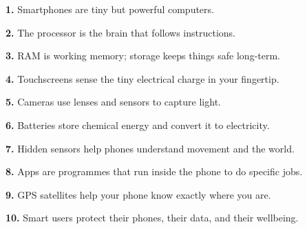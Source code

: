 \documentclass[11pt,openany]{book}
\begin{document}
\begin{tcolorbox}[enhanced,colback=LightGray,colframe=TechPurple!60,arc=8pt,boxrule=1pt,left=10pt,right=10pt,top=10pt,bottom=10pt]
  \begin{minipage}[t]{0.48\linewidth}
    \begin{tcolorbox}[colback=TechPurple!12,colframe=TechPurple,arc=4pt,boxrule=0.8pt]\textbf{1.} Smartphones are tiny but powerful computers.\end{tcolorbox}
    \begin{tcolorbox}[colback=WarmOrange!20,colframe=WarmOrange!80!black,arc=4pt,boxrule=0.8pt]\textbf{2.} The processor is the brain that follows instructions.\end{tcolorbox}
    \begin{tcolorbox}[colback=LeafGreen!18,colframe=LeafGreen!70!black,arc=4pt,boxrule=0.8pt]\textbf{3.} RAM is working memory; storage keeps things safe long-term.\end{tcolorbox}
    \begin{tcolorbox}[colback=SoftPurple!15,colframe=SoftPurple!70!black,arc=4pt,boxrule=0.8pt]\textbf{4.} Touchscreens sense the tiny electrical charge in your fingertip.\end{tcolorbox}
    \begin{tcolorbox}[colback=SunYellow!20,colframe=SunYellow!70!black,arc=4pt,boxrule=0.8pt]\textbf{5.} Cameras use lenses and sensors to capture light.\end{tcolorbox}
  \end{minipage}\hfill
  \begin{minipage}[t]{0.48\linewidth}
    \begin{tcolorbox}[colback=CoralRed!12,colframe=CoralRed!70!black,arc=4pt,boxrule=0.8pt]\textbf{6.} Batteries store chemical energy and convert it to electricity.\end{tcolorbox}
    \begin{tcolorbox}[colback=NeonGreen!12,colframe=NeonGreen,arc=4pt,boxrule=0.8pt]\textbf{7.} Hidden sensors help phones understand movement and the world.\end{tcolorbox}
    \begin{tcolorbox}[colback=SkyBlue!18,colframe=SmartBlue!70!black,arc=4pt,boxrule=0.8pt]\textbf{8.} Apps are programmes that run inside the phone to do specific jobs.\end{tcolorbox}
    \begin{tcolorbox}[colback=TechPurple!10,colframe=TechPurple!80!black,arc=4pt,boxrule=0.8pt]\textbf{9.} GPS satellites help your phone know exactly where you are.\end{tcolorbox}
    \begin{tcolorbox}[colback=LeafGreen!12,colframe=LeafGreen!75!black,arc=4pt,boxrule=0.8pt]\textbf{10.} Smart users protect their phones, their data, and their wellbeing.\end{tcolorbox}
  \end{minipage}
\end{tcolorbox}







\printindex
\end{document}
